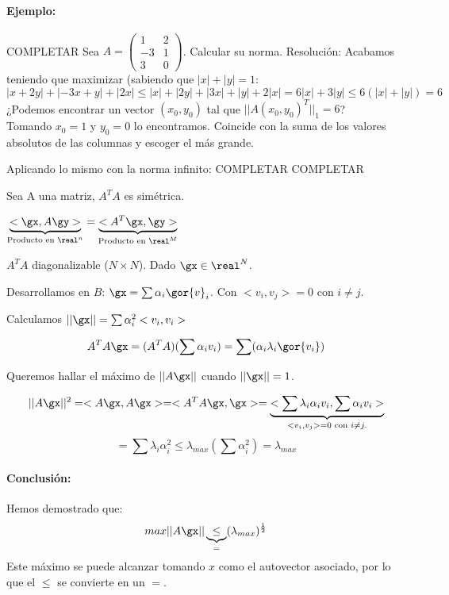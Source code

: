 \documentclass{apuntes}
\begin{document}
\paragraph{Ejemplo:}COMPLETAR
Sea $A = \begin{pmatrix}
      1&2\\-3&1\\3&0
     \end{pmatrix}$. Calcular su norma.
Resolución:
Acabamos teniendo que maximizar (sabiendo que $|x|+|y| = 1$: $|x+2y| + |-3x+y| + |2x| \leq |x|+|2y| + |3x| + |y| + 2|x| = 6|x|+3|y| \leq 6 (|x|+|y|) =6$
¿Podemos encontrar un vector $(x_0,y_0)$ tal que $||A(x_0,y_0)^T||_1 = 6$?\\
Tomando $x_0 = 1$ y $y_0 = 0$ lo encontramos.
\obs Coincide con la suma de los valores absolutos de las columnas y escoger el más grande.

Aplicando lo mismo con la norma infinito: COMPLETAR
COMPLETAR

\begin{lemma}
 Sea A una matriz, $A^TA$ es simétrica.
\end{lemma}
\begin{lemma}
 $\underbrace{<\gx,A\gy>}_{\text{Producto en } \real^n} = \underbrace{<A^T\gx,\gy>}_{\text{Producto en } \real^M}$
\end{lemma}

 $A^TA$ diagonalizable ($N \times N$). Dado $\gx \in \real^N$.

 Desarrollamos en $B$: $\gx = \sum \alpha_i \gor{v}_i$. Con $<v_i,v_j> = 0$ con $i \neq j$.

 Calculamos $||\gx|| = \sum \alpha_i^2<v_i,v_i>$
 
 $$A^TA\gx = (A^TA)(\sum \alpha_i v_i) = \sum (\alpha_i\lambda_i\gor{v_i})$$
 
 Queremos hallar el máximo de $||A\gx||$ cuando $||\gx|| = 1$.
 
 $$||A\gx||^2 = <A\gx,A\gx> = <A^TA\gx,\gx> = \underbrace{<\sum \lambda_i \alpha_i v_i,\sum\alpha_i v_i>}_{<v_i,v_j> =0 \text{ con } i \neq j.}$$
 $$= \sum \lambda_i \alpha_i^2 \leq \lambda_{max} (\sum \alpha_i^2) = \lambda_{max}$$
 
 \paragraph{Conclusión: }
 Hemos demostrado que:
 $$ max||A\gx|| \underbrace{\leq}_{=} ({\lambda_{max}})^{\frac{1}{2}}$$
 Este máximo se puede alcanzar tomando $x$ como el autovector asociado, por lo que el $\leq$ se convierte en un $=$.
 
\end{document}
